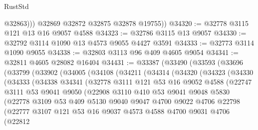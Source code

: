 \begin{lexlean}{RustStd}
\begin{coremodule}
              @32863)))
        @32869
        @32872
        @32875
        @32878
        @19755))
@34320 := @32778 @3115 @121 @13 @16 @9057 @4588
@34323 := @32786 @3115 @13 @9057
@34330 := @32792 @3114 @1090 @13 @4573 @9055 @4427 @3591
@34333 := @32773 @3114 @1090 @9055
@34338 := @32803 @3113 @96 @409 @4605 @9054
@34341 := @32811 @4605 @28082 @16404
@34431 := @33387
    (@33490
      (@33593
        (@33696
          (@33799
            (@33902
              (@34005
                (@34108
                  (@34211
                    (@34314
                      (@34320
                        (@34323
                          (@34330
                            (@34333
                              (@34338
                                @34341
                                (@32778
                                  @3111
                                  @121
                                  @53
                                  @16
                                  @9052
                                  @4588
                                  (@22747
                                    @3111
                                    @53
                                    @9041
                                    @9050
                                    (@22908
                                      @3110
                                      @410
                                      @53
                                      @9041
                                      @9048
                                      @5830
                                      (@22778
                                        @3109
                                        @53
                                        @409
                                        @5130
                                        @9040
                                        @9047
                                        @4700
                                        @9022
                                        @4706
                                        @22798
                                        (@22777
                                          @3107
                                          @121
                                          @53
                                          @16
                                          @9037
                                          @4573
                                          @4588
                                          @4700
                                          @9031
                                          @4706
                                          (@22812

\end{coremodule}
\end{lexlean}
